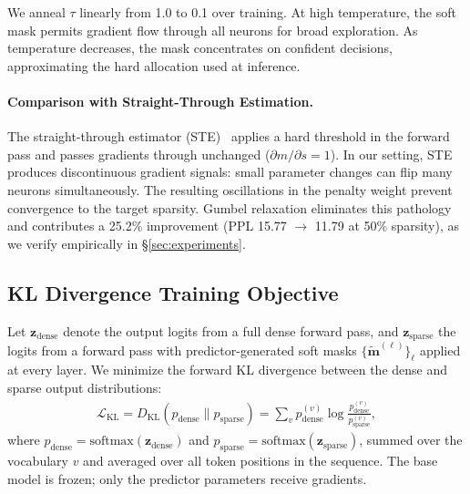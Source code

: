 We anneal $\tau$ linearly from 1.0 to 0.1 over training.
At high temperature, the soft mask permits gradient flow through all neurons for broad exploration.
As temperature decreases, the mask concentrates on confident decisions, approximating the hard allocation used at inference.

\paragraph{Comparison with Straight-Through Estimation.}
The straight-through estimator (STE)~\cite{bengio2013ste} applies a hard threshold in the forward pass and passes gradients through unchanged ($\partial m / \partial s = 1$).
In our setting, STE produces discontinuous gradient signals: small parameter changes can flip many neurons simultaneously. The resulting oscillations in the penalty weight prevent convergence to the target sparsity.
Gumbel relaxation eliminates this pathology and contributes a 25.2\% improvement (PPL 15.77 $\to$ 11.79 at 50\% sparsity), as we verify empirically in \S\ref{sec:experiments}.


\subsection{KL Divergence Training Objective}
\label{sec:method:kl}

Let $\mathbf{z}_{\text{dense}}$ denote the output logits from a full dense forward pass, and $\mathbf{z}_{\text{sparse}}$ the logits from a forward pass with predictor-generated soft masks $\{\tilde{\mathbf{m}}^{(\ell)}\}_\ell$ applied at every layer.
We minimize the forward KL divergence between the dense and sparse output distributions:
\begin{align}
\mathcal{L}_{\text{KL}} \!=\! D_{\text{KL}}(p_{\text{dense}} \| p_{\text{sparse}}) \!=\! \sum_{v} p_{\text{dense}}^{(v)} \log \frac{p_{\text{dense}}^{(v)}}{p_{\text{sparse}}^{(v)}},
\label{eq:kl_loss}
\end{align}
where $p_{\text{dense}} = \text{softmax}(\mathbf{z}_{\text{dense}})$ and $p_{\text{sparse}} = \text{softmax}(\mathbf{z}_{\text{sparse}})$, summed over the vocabulary $v$ and averaged over all token positions in the sequence.
The base model is frozen; only the predictor parameters receive gradients.

